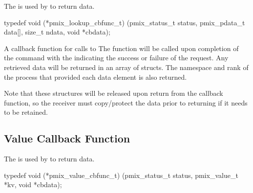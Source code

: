 The  is used by  to return data.

\cspecificstart
\begin{codepar}
typedef void (*pmix_lookup_cbfunc_t)
    (pmix_status_t status,
     pmix_pdata_t data[], size_t ndata,
     void *cbdata);
\end{codepar}
\cspecificend

\begin{arglist}
\end{arglist}


\descr

A callback function for calls to 
The function will be called upon completion of the command with the  indicating the success or failure of the request.
Any retrieved data will be returned in an array of  structs.
The namespace and rank of the process that provided each data element is also returned.

Note that these structures will be released upon return from the callback function, so the receiver must copy/protect the data prior to returning if it needs to be retained.


\subsection{Value Callback Function}

\summary

The  is used by  to return data.

\cspecificstart
\begin{codepar}
typedef void (*pmix_value_cbfunc_t)
    (pmix_status_t status,
     pmix_value_t *kv, void *cbdata);
\end{codepar}
\cspecificend

\begin{arglist}
\end{arglist}


